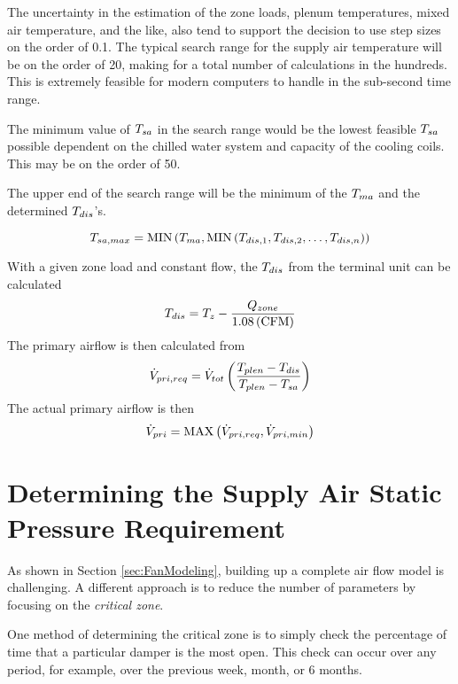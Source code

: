 The uncertainty in the estimation of the zone loads, plenum temperatures, mixed air temperature, and the like, also tend to support the decision to use step sizes on the order of  \SI{0.1}{\degreeF}. The typical search range for the supply air temperature will be on the order of \SI{20}{\degreeF}, making for a total number of calculations in the hundreds. 
This is extremely feasible for modern computers to handle in the sub-second time range. 

The minimum value of \(T_{sa}\) in the search range would be the lowest feasible \(T_{sa}\) possible dependent on the chilled water system and capacity of the cooling coils. 
This may be on the order of \SI{50}{\degreeF}.

The upper end of the search range will be the minimum of the \(T_{ma}\) and the determined \(T_{dis}\)'s.

\begin{equation}
    T_{sa,max} = \text{MIN}\left(T_{ma}, \text{MIN}\left(T_{dis,1}, T_{dis,2}, \ldots, T_{dis,n} \right) \right)
\end{equation}

With a given zone load and constant flow, the \(T_{dis}\) from the terminal unit can be calculated 
\begin{equation}
    T_{dis} = T_{z} -  \frac{Q_{zone}}{1.08 \left( \text{CFM} \right)   }
\end{equation}
The primary airflow is then calculated from
\begin{equation}
    \dot{V}_{pri, req} = \dot{V}_{tot} \left( \frac{T_{plen} - T_{dis} }{T_{plen} - T_{sa}} \right) 
\end{equation}
The actual primary airflow is then 
\begin{equation}
    \dot{V}_{pri} = \text{MAX}\left(\dot{V}_{pri, req}, \dot{V}_{pri, min}  \right)
\end{equation}

\section{Determining the Supply Air Static Pressure Requirement}

As shown in Section \ref{sec:FanModeling}, building up a complete air flow model is challenging. A different approach is to reduce the number of parameters by focusing on the \textit{critical zone}. 

One method of determining the critical zone is to simply check the percentage of time that a particular damper is the most open. This check can occur over any period, for example, over the previous week, month, or 6 months.

